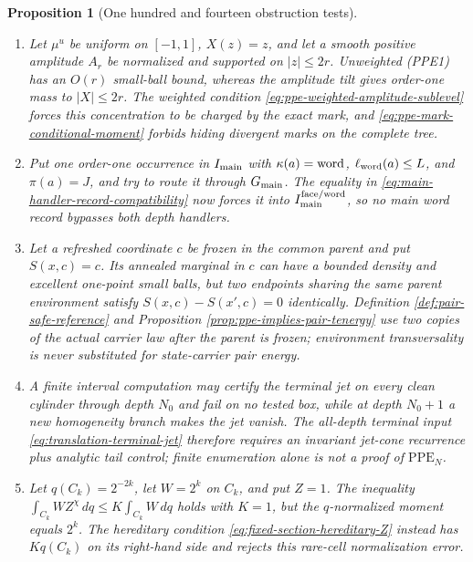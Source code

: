 \documentclass[11pt]{article}
\newtheorem{proposition}[theorem]{Proposition}
\begin{document}
\begin{proposition}[One hundred and fourteen obstruction tests]
\begin{enumerate}[label=\textup{(T\arabic*)}]
      Proposition~\ref{prop:scaled-face-density} therefore makes no global
      moment claim; the complete-law moment ledger is indispensable.
\item Let $\mu^u$ be uniform on $[-1,1]$, $X(z)=z$, and let a smooth positive
      amplitude $A_r$ be normalized and supported on $|z|\le2r$.  Unweighted
      \textup{(PPE1)} has an $O(r)$ small-ball bound, whereas the amplitude
      tilt gives order-one mass to $|X|\le2r$.  The weighted condition
      \eqref{eq:ppe-weighted-amplitude-sublevel} forces this concentration to
      be charged by the exact mark, and
      \eqref{eq:ppe-mark-conditional-moment} forbids hiding divergent marks
      on the complete tree.
\item Put one order-one occurrence in $I_{\rm main}$ with
      $\kappa(a)={\rm word}$, $\ell_{\rm word}(a)\le L$, and $\pi(a)=J$, and
      try to route it through $G_{\rm main}$.  The equality in
      \eqref{eq:main-handler-record-compatibility} now forces it into
      $I_{\rm main}^{\rm face/word}$, so no main word record bypasses both
      depth handlers.
\item Let a refreshed coordinate $c$ be frozen in the common parent and put
      $S(x,c)=c$.  Its annealed marginal in $c$ can have a bounded density and
      excellent one-point small balls, but two endpoints sharing the same
      parent environment satisfy $S(x,c)-S(x',c)=0$ identically.  Definition
      \ref{def:pair-safe-reference} and Proposition
      \ref{prop:ppe-implies-pair-tenergy} use two copies of the actual carrier
      law after the parent is frozen; environment transversality is never
      substituted for state-carrier pair energy.
\item A finite interval computation may certify the terminal jet on every
      clean cylinder through depth $N_0$ and fail on no tested box, while at
      depth $N_0+1$ a new homogeneity branch makes the jet vanish.  The
      all-depth terminal input \eqref{eq:translation-terminal-jet} therefore
      requires an invariant jet-cone recurrence plus analytic tail control;
      finite enumeration alone is not a proof of $\mathrm{PPE}_{N}$.
\item Let $q(C_k)=2^{-2k}$, let $W=2^k$ on $C_k$, and put $Z=1$.
      The inequality
      $\int_{C_k}WZ^\chi\,dq\le K\int_{C_k}W\,dq$ holds with $K=1$,
      but the $q$-normalized moment equals $2^k$.  The hereditary condition
      \eqref{eq:fixed-section-hereditary-Z} instead has $Kq(C_k)$ on its
      right-hand side and rejects this rare-cell normalization error.

\end{enumerate}
\end{proposition}
\end{document}
